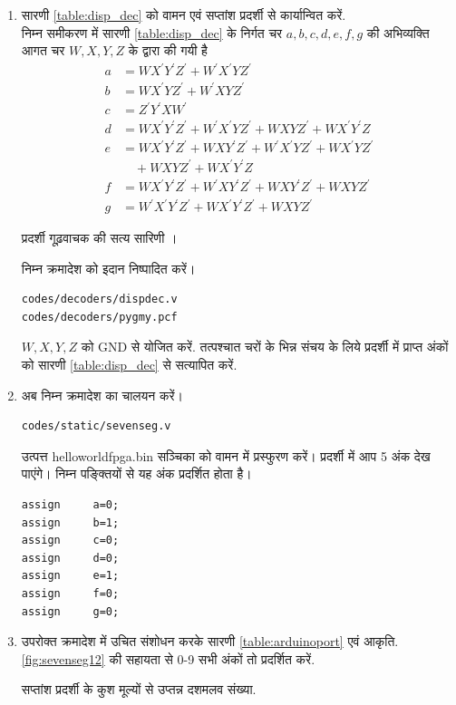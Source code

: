 \documentclass[journal,12pt,twocolumn]{IEEEtran}
\renewcommand\thesection{\arabic{section}}
\begin{document}
\begin{enumerate}[label=\thesection.\arabic*.,ref=\thesection.\theenumi]
\item सारणी \ref{table:disp_dec} को वामन एवं सप्तांश प्रदर्शी से कार्यान्वित करें.
\\
\solution निम्न समीकरण में  सारणी \ref{table:disp_dec}  के निर्गत चर  $a,b,c,d,e,f,g$ की अभिव्यक्ति आगत चर $W,X,Y,Z$ के द्वारा की गयी है
%
\begin{align}
\label{eq:disp_a}
a &= WX^{\prime}Y^{\prime}Z^{\prime}+W^{\prime}X^{\prime}YZ^{\prime}
\\
\label{eq:disp_b}
b &= WX^{\prime}YZ^{\prime}+W^{\prime}XYZ^{\prime}
\\
\label{eq:disp_c}
c &= {Z}^{\prime}{Y}^{\prime}X{W}^{\prime}
\\
d &= WX^{\prime}Y^{\prime}Z^{\prime}+W^{\prime}X^{\prime}YZ^{\prime}+WXYZ^{\prime}+WX^{\prime}Y^{\prime}Z
\label{eq:disp_d}
\\
e &= WX^{\prime}Y^{\prime}Z^{\prime}+WXY^{\prime}Z^{\prime}+W^{\prime}X^{\prime}YZ^{\prime}+WX^{\prime}YZ^{\prime}
\nonumber \\
&\quad +WXYZ^{\prime}+WX^{\prime}Y^{\prime}Z
\label{eq:disp_e}
\\
f &= WX^{\prime}Y^{\prime}Z^{\prime}+W^{\prime}XY^{\prime}Z^{\prime}+WXY^{\prime}Z^{\prime}+WXYZ^{\prime}
\label{eq:disp_f}
\\
g &= W^{\prime}X^{\prime}Y^{\prime}Z^{\prime}+WX^{\prime}Y^{\prime}Z^{\prime}+WXYZ^{\prime}
\label{eq:disp_g}
\end{align}
\begin{table}
\centering

\caption{प्रदर्शी गूढ़वाचक की सत्य सारिणी ।}
\label{table:disp_dec}
\end{table}
%
निम्न क्रमादेश को इदान निष्पादित करें।
\begin{lstlisting}
codes/decoders/dispdec.v
codes/decoders/pygmy.pcf
\end{lstlisting}
$W, X, Y, Z$ को GND से योजित करें.  तत्पश्चात चरों के भिन्न संचय के लिये प्रदर्शी में प्राप्त अंकों को सारणी \ref{table:disp_dec}  से सत्यापित करें.
\item अब निम्न क्रमादेश का चालयन करें।
\label{code:sevenseg}
\begin{lstlisting}
codes/static/sevenseg.v
\end{lstlisting}
उत्पत्त helloworldfpga.bin सञ्चिका  को  वामन में प्रस्फुरण करें।  प्रदर्शी में आप 5 अंक देख पाएंगे।
निम्न पङ्क्तियों से  यह अंक  प्रदर्शित होता  है।
\begin{lstlisting}
assign     a=0;
assign     b=1;
assign     c=0;
assign     d=0;
assign     e=1;
assign     f=0;
assign     g=0;
\end{lstlisting}
\item उपरोक्त क्रमादेश में उचित संशोधन करके सारणी \ref{table:arduinoport} एवं आकृति.  \ref{fig:sevenseg12} की सहायता से 0-9 सभी अंकों तो प्रदर्शित करें.
\begin{table}[!ht]
\centering
\resizebox{\columnwidth}{!}{

}
\caption{सप्तांश प्रदर्शी के कुश मूल्यों से उप्तन्न दशमलव संख्या. }
\label{table:arduinoport}
\end{table}
\end{enumerate}
%
\end{document}

